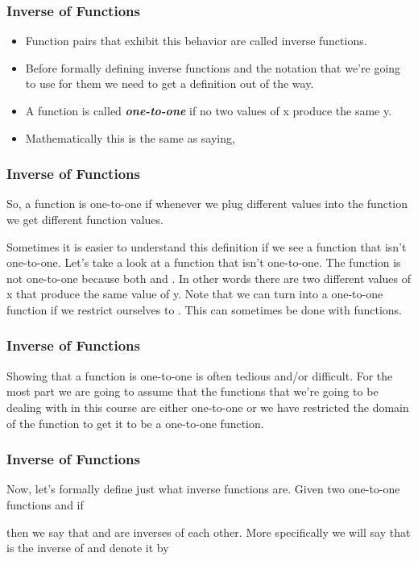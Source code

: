 \documentclass{beamer}
\begin{document}
\begin{frame}[fragile]
	\frametitle{Inverse of Functions}
	\Large
\begin{itemize}
\item Function pairs that exhibit this behavior are called inverse functions. 
\item Before formally defining inverse functions and the notation that we’re going to use for them we need to get a definition out of the way.   

\item A function is called \textbf{\textit{one-to-one}} if no two values of x produce the same y.  
\item Mathematically this is the same as saying,
\end{itemize}

\end{frame}
\begin{frame}[fragile]
	\frametitle{Inverse of Functions}
	\Large
So, a function is one-to-one if whenever we plug different values into the function we get different function values.

Sometimes it is easier to understand this definition if we see a function that isn’t one-to-one.  Let’s take a look at a function that isn’t one-to-one.  The function  is not one-to-one because both  and .  In other words there are two different values of x that produce the same value of y.  Note that we can turn  into a one-to-one function if we restrict ourselves to .  This can sometimes be done with functions.
\end{frame}
\begin{frame}[fragile]
	\frametitle{Inverse of Functions}
	\Large
Showing that a function is one-to-one is often tedious and/or difficult.  For the most part we are going to assume that the functions that we’re going to be dealing with in this course are either one-to-one or we have restricted the domain of the function to get it to be a one-to-one function.

\end{frame}
\begin{frame}[fragile]
	\frametitle{Inverse of Functions}
	\Large
	
Now, let’s formally define just what inverse functions are.  Given two one-to-one functions  and  if


then we say that  and  are inverses of each other.  More specifically we will say that  is the inverse of  and denote it by

\end{frame}
\end{document}
